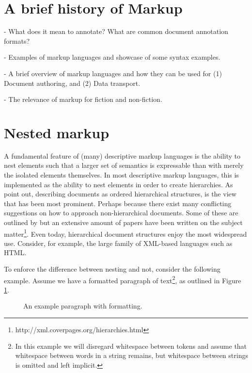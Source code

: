 \documentclass{scrreprt}
\begin{document}
\section{A brief history of Markup}

- What does it mean to annotate? What are common document annotation formats?

- Examples of markup languages and showcase of some syntax examples.

- A brief overview of markup languages and how they can be used for (1) Document authoring, and (2) Data transport.

- The relevance of markup for fiction and non-fiction.








\section{Nested markup}
\label{sec:nesting}
A fundamental feature of (many) descriptive markup languages is the ability to nest elements such that a larger set of semantics is expressable than with merely the isolated elements themselves. In most descriptive markup languages, this is implemented as the ability to nest elements in order to create hierarchies. As \citet*{durand} point out, describing documents as ordered hierarchical structures, is the view that has been most prominent. Perhaps because there exist many conflicting suggestions on how to approach non-hierarchical documents. Some of these are outlined by \citet{durand} but an extensive amount of papers have been written on the subject matter\footnote{http://xml.coverpages.org/hierarchies.html}. Even today, hierarchical document structures enjoy the most widespread use. Consider, for example, the large family of XML-based languages such as HTML.



To enforce the difference between nesting and not, consider the following example. Assume we have a formatted paragraph of text\footnote{In this example we will disregard whitespace between tokens and assume that whitespace between words in a string remains, but whitespace between strings is omitted and left implicit.}, as outlined in Figure \ref{fig:mixed-content-paragraph}.


\begin{figure}[h]
\centering
{}
\caption{An example paragraph with formatting.}
\label{fig:mixed-content-paragraph}
\end{figure}
\end{document}
